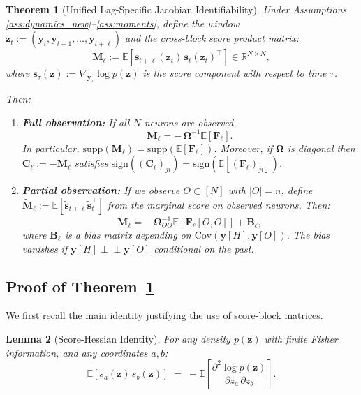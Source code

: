 \documentclass{article}
\theoremstyle{plain}
\newtheorem{theorem}{Theorem}[section]
\newtheorem{lemma}[theorem]{Lemma}
\theoremstyle{definition}
\theoremstyle{remark}
\newcommand{\R}{\mathbb{R}}
\newcommand{\E}{\mathbb{E}}
\newcommand{\Cov}{\mathrm{Cov}}
\newcommand{\1}{\mathbf{1}}
\newcommand{\supp}{\mathrm{supp}}
\newcommand{\y}{\bm{y}}
\newcommand{\z}{\bm{z}}
\newcommand{\s}{\bm{s}}
\begin{document}
\begin{theorem}[Unified Lag-Specific Jacobian Identifiability]
\label{thm:unified_new}
Under Assumptions \ref{ass:dynamics_new}--\ref{ass:moments}, define the window $\z_t := (\y_t, \y_{t+1}, \ldots, \y_{t+\ell})$ and the cross-block score product matrix:
$$
\bm{M}_\ell := \E\left[\s_{t+\ell}(\z_t) \, \s_t(\z_t)^\top\right] \in \R^{N \times N},
$$
where $\s_\tau(\z) := \nabla_{\y_\tau} \log p(\z)$ is the score component with respect to time $\tau$.

Then:
\begin{enumerate}[label=\textbf{(\alph*)}, leftmargin=2em]
\item \textbf{Full observation:} If all $N$ neurons are observed,
\begin{equation}
\bm{M}_\ell = -\,\bm{\Omega}^{-1} \E[\bm{F}_\ell].
\label{eq:full_id}
\end{equation}
In particular, $\supp(\bm{M}_\ell) = \supp(\E[\bm{F}_\ell])$. Moreover, if $\bm{\Omega}$ is diagonal then $\bm{C}_\ell := -\bm{M}_\ell$ satisfies $\mathrm{sign}((\bm{C}_\ell)_{ji}) = \mathrm{sign}(\E[(\bm{F}_\ell)_{ji}])$.

\item \textbf{Partial observation:} If we observe $O \subset [N]$ with $|O| = n$, define $\tilde{\bm{M}}_\ell := \E[\tilde{\s}_{t+\ell} \tilde{\s}_t^\top]$ from the marginal score on observed neurons. Then:
\begin{equation}
\tilde{\bm{M}}_\ell = -\,\bm{\Omega}_{OO}^{-1} \E[\bm{F}_\ell[O,O]] + \bm{B}_\ell,
\label{eq:partial_id_new}
\end{equation}
where $\bm{B}_\ell$ is a bias matrix depending on $\Cov(\y[H], \y[O])$. The bias vanishes if $\y[H] \perp\!\!\!\perp \y[O]$ conditional on the past.

\end{enumerate}
\end{theorem}

\subsection{Proof of Theorem~\ref{thm:unified_new}}


We first recall the main identity justifying the use of score-block matrices.

\begin{lemma}[Score-Hessian Identity]
\label{lem:score_hess}
For any density $p(\z)$ with finite Fisher information, and any coordinates $a, b$:
$$
\E[s_a(\z)\, s_b(\z)] \;=\; -\E\!\left[\frac{\partial^2 \log p(\z)}{\partial z_a\, \partial z_b}\right].
$$
\end{lemma}
\end{document}
